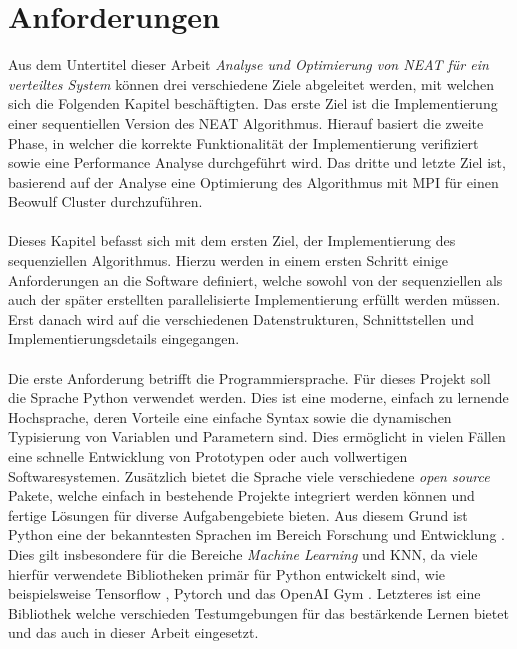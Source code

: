 \section{Anforderungen}
Aus dem Untertitel dieser Arbeit \emph{Analyse und Optimierung von \ac{NEAT} für ein verteiltes System} können drei verschiedene Ziele abgeleitet werden, mit welchen sich die Folgenden Kapitel beschäftigten. Das erste Ziel ist die Implementierung einer sequentiellen Version des \ac{NEAT} Algorithmus. Hierauf basiert die zweite Phase, in welcher die korrekte Funktionalität der Implementierung verifiziert sowie eine Performance Analyse durchgeführt wird. Das dritte und letzte Ziel ist, basierend auf der Analyse eine Optimierung des Algorithmus mit \ac{MPI} für einen Beowulf Cluster durchzuführen.  
\\\\
Dieses Kapitel befasst sich mit dem ersten Ziel, der Implementierung des sequenziellen Algorithmus. Hierzu werden in einem ersten Schritt einige Anforderungen an die Software definiert, welche sowohl von der sequenziellen als auch der später erstellten parallelisierte Implementierung erfüllt werden müssen. Erst danach wird auf die verschiedenen Datenstrukturen, Schnittstellen und Implementierungsdetails eingegangen.
\\\\
Die erste Anforderung betrifft die Programmiersprache. Für dieses Projekt soll die Sprache Python verwendet werden. Dies ist eine moderne, einfach zu lernende Hochsprache, deren Vorteile eine einfache Syntax sowie die dynamischen Typisierung von Variablen und Parametern sind. Dies ermöglicht in vielen Fällen eine schnelle Entwicklung von Prototypen oder auch vollwertigen Softwaresystemen. Zusätzlich bietet die Sprache viele verschiedene \emph{open source} Pakete, welche einfach in bestehende Projekte integriert werden können und fertige Lösungen für diverse Aufgabengebiete bieten. Aus diesem Grund ist Python eine der bekanntesten Sprachen im Bereich Forschung und Entwicklung \cite{dalcin2011parallel}. Dies gilt insbesondere für die Bereiche \emph{Machine Learning} und \ac{KNN}, da viele hierfür verwendete Bibliotheken primär für Python entwickelt sind, wie beispielsweise Tensorflow \cite{tensorflow2015}, Pytorch \cite{pytorch2019} und das OpenAI Gym \cite{OpenAiGym2016}. Letzteres ist eine Bibliothek welche verschieden Testumgebungen für das bestärkende Lernen bietet und das auch in dieser Arbeit eingesetzt.  
\\\\
